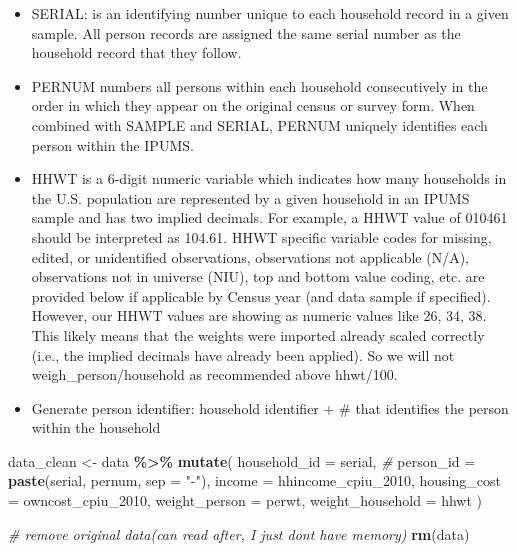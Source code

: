 \documentclass[
]{article}
\newenvironment{Shaded}{\begin{snugshade}}{\end{snugshade}}
\newcommand{\AttributeTok}[1]{\textcolor[rgb]{0.13,0.29,0.53}{#1}}
\newcommand{\CommentTok}[1]{\textcolor[rgb]{0.56,0.35,0.01}{\textit{#1}}}
\newcommand{\FunctionTok}[1]{\textcolor[rgb]{0.13,0.29,0.53}{\textbf{#1}}}
\newcommand{\NormalTok}[1]{#1}
\newcommand{\OtherTok}[1]{\textcolor[rgb]{0.56,0.35,0.01}{#1}}
\newcommand{\SpecialCharTok}[1]{\textcolor[rgb]{0.81,0.36,0.00}{\textbf{#1}}}
\newcommand{\StringTok}[1]{\textcolor[rgb]{0.31,0.60,0.02}{#1}}
\begin{document}
\begin{itemize}
\item
  SERIAL: is an identifying number unique to each household record in a
  given sample. All person records are assigned the same serial number
  as the household record that they follow.
\item
  PERNUM numbers all persons within each household consecutively in the
  order in which they appear on the original census or survey form. When
  combined with SAMPLE and SERIAL, PERNUM uniquely identifies each
  person within the IPUMS.
\item
  HHWT is a 6-digit numeric variable which indicates how many households
  in the U.S. population are represented by a given household in an
  IPUMS sample and has two implied decimals. For example, a HHWT value
  of 010461 should be interpreted as 104.61. HHWT specific variable
  codes for missing, edited, or unidentified observations, observations
  not applicable (N/A), observations not in universe (NIU), top and
  bottom value coding, etc. are provided below if applicable by Census
  year (and data sample if specified). However, our HHWT values are
  showing as numeric values like 26, 34, 38. This ️likely means that the
  weights were imported already scaled correctly (i.e., the implied
  decimals have already been applied). So we will not
  weigh\_person/household as recommended above hhwt/100.
\item
  Generate person identifier: household identifier + \# that identifies
  the person within the household
\end{itemize}

\begin{Shaded}
\begin{Highlighting}[]
\NormalTok{data\_clean }\OtherTok{\textless{}{-}}\NormalTok{ data }\SpecialCharTok{\%\textgreater{}\%}
  \FunctionTok{mutate}\NormalTok{(}
    \AttributeTok{household\_id =}\NormalTok{ serial, }\CommentTok{\# }
    \AttributeTok{person\_id =} \FunctionTok{paste}\NormalTok{(serial, pernum, }\AttributeTok{sep =} \StringTok{"{-}"}\NormalTok{), }
    \AttributeTok{income =}\NormalTok{ hhincome\_cpiu\_2010,}
    \AttributeTok{housing\_cost =}\NormalTok{ owncost\_cpiu\_2010, }
    \AttributeTok{weight\_person =}\NormalTok{ perwt,}
    \AttributeTok{weight\_household =}\NormalTok{ hhwt}
\NormalTok{  )}

\CommentTok{\# remove original data(can read after, I just don\textquotesingle{}t have memory)}
\FunctionTok{rm}\NormalTok{(data)}
\end{Highlighting}
\end{Shaded}
\end{document}
